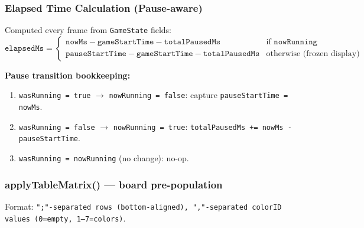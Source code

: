\documentclass[12pt,a4paper]{article}
\begin{document}
\subsubsection{Elapsed Time Calculation (Pause-aware)}

\noindent Computed every frame from \texttt{GameState} fields:
\[
  \texttt{elapsedMs} = \begin{cases}
    \texttt{nowMs} - \texttt{gameStartTime} - \texttt{totalPausedMs}
      & \text{if } \texttt{nowRunning} \\[4pt]
    \texttt{pauseStartTime} - \texttt{gameStartTime} - \texttt{totalPausedMs}
      & \text{otherwise (frozen display)}
  \end{cases}
\]

\noindent\textbf{Pause transition bookkeeping:}
\begin{enumerate}[nosep,label=\arabic*.]
  \item \texttt{wasRunning = true} $\rightarrow$ \texttt{nowRunning = false}:
        capture \texttt{pauseStartTime = nowMs}.
  \item \texttt{wasRunning = false} $\rightarrow$ \texttt{nowRunning = true}:
        \texttt{totalPausedMs += nowMs - pauseStartTime}.
  \item \texttt{wasRunning = nowRunning} (no change): no-op.
\end{enumerate}

\subsubsection{applyTableMatrix() --- board pre-population}

\noindent Format: \foreignlanguage{english}{\texttt{";"-separated rows (bottom-aligned), ","-separated
colorID values (0=empty, 1--7=colors)}}.

\begin{center}
\end{center}
\end{document}
